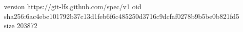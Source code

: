 version https://git-lfs.github.com/spec/v1
oid sha256:6ac4ebc101792b37c13d1feb6f6c485250d3716c9dcfaf0278b9b5be0b821fd5
size 203872
